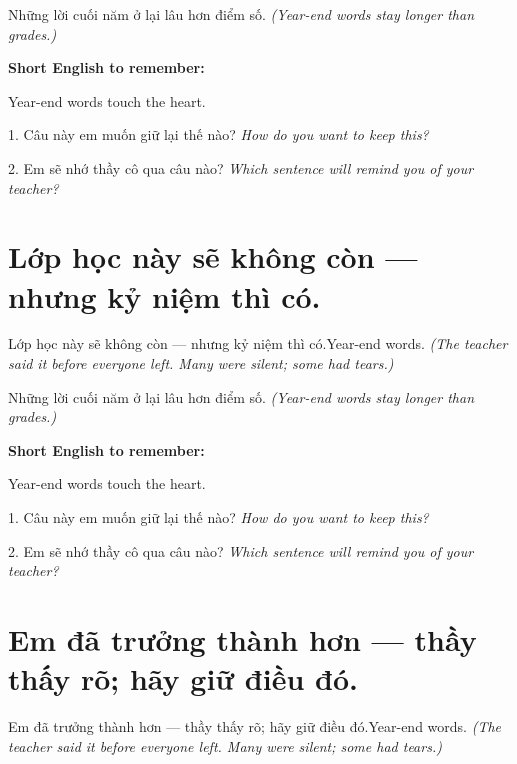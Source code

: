 \begin{baihoc}
Những lời cuối năm ở lại lâu hơn điểm số.
\textit{(Year-end words stay longer than grades.)}
\end{baihoc}

\begin{ghinhoanh}
\textbf{Short English to remember:}

Year-end words touch the heart.

\end{ghinhoanh}

\begin{tuhocnhanh}
1. Câu này em muốn giữ lại thế nào? \textit{How do you want to keep this?}

2. Em sẽ nhớ thầy cô qua câu nào? \textit{Which sentence will remind you of your teacher?}
\end{tuhocnhanh}
\ngancach


\section{Lớp học này sẽ không còn — nhưng kỷ niệm thì có.}
\begin{truyen}{Lớp học này sẽ không còn — nhưng kỷ niệm thì có.}{Year-end words.}
\textit{(The teacher said it before everyone left. Many were silent; some had tears.)}
\end{truyen}

\begin{baihoc}
Những lời cuối năm ở lại lâu hơn điểm số.
\textit{(Year-end words stay longer than grades.)}
\end{baihoc}

\begin{ghinhoanh}
\textbf{Short English to remember:}

Year-end words touch the heart.

\end{ghinhoanh}

\begin{tuhocnhanh}
1. Câu này em muốn giữ lại thế nào? \textit{How do you want to keep this?}

2. Em sẽ nhớ thầy cô qua câu nào? \textit{Which sentence will remind you of your teacher?}
\end{tuhocnhanh}
\ngancach


\section{Em đã trưởng thành hơn — thầy thấy rõ; hãy giữ điều đó.}
\begin{truyen}{Em đã trưởng thành hơn — thầy thấy rõ; hãy giữ điều đó.}{Year-end words.}
\textit{(The teacher said it before everyone left. Many were silent; some had tears.)}
\end{truyen}

